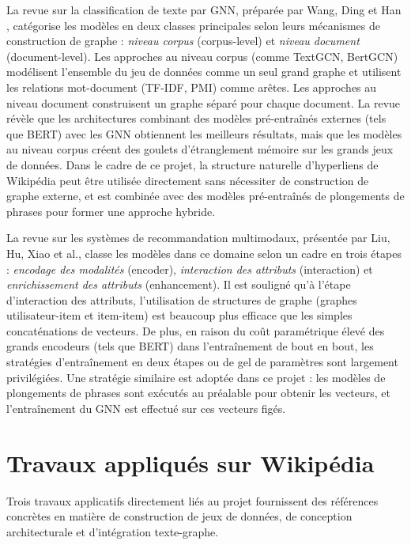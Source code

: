 La revue sur la classification de texte par GNN, préparée par Wang, Ding et Han \cite{li2022graph}, catégorise les modèles en deux classes principales selon leurs mécanismes de construction de graphe : \textit{niveau corpus} (corpus-level) et \textit{niveau document} (document-level). Les approches au niveau corpus (comme TextGCN, BertGCN) modélisent l'ensemble du jeu de données comme un seul grand graphe et utilisent les relations mot-document (TF-IDF, PMI) comme arêtes. Les approches au niveau document construisent un graphe séparé pour chaque document. La revue révèle que les architectures combinant des modèles pré-entraînés externes (tels que BERT) avec les GNN obtiennent les meilleurs résultats, mais que les modèles au niveau corpus créent des goulets d'étranglement mémoire sur les grands jeux de données. Dans le cadre de ce projet, la structure naturelle d'hyperliens de Wikipédia peut être utilisée directement sans nécessiter de construction de graphe externe, et est combinée avec des modèles pré-entraînés de plongements de phrases pour former une approche hybride.

La revue sur les systèmes de recommandation multimodaux, présentée par Liu, Hu, Xiao et al.\@ \cite{zhou2023multimodal}, classe les modèles dans ce domaine selon un cadre en trois étapes : \textit{encodage des modalités} (encoder), \textit{interaction des attributs} (interaction) et \textit{enrichissement des attributs} (enhancement). Il est souligné qu'à l'étape d'interaction des attributs, l'utilisation de structures de graphe (graphes utilisateur-item et item-item) est beaucoup plus efficace que les simples concaténations de vecteurs. De plus, en raison du coût paramétrique élevé des grands encodeurs (tels que BERT) dans l'entraînement de bout en bout, les stratégies d'entraînement en deux étapes ou de gel de paramètres sont largement privilégiées. Une stratégie similaire est adoptée dans ce projet : les modèles de plongements de phrases sont exécutés au préalable pour obtenir les vecteurs, et l'entraînement du GNN est effectué sur ces vecteurs figés.

\section{Travaux appliqués sur Wikipédia}

Trois travaux applicatifs directement liés au projet fournissent des références concrètes en matière de construction de jeux de données, de conception architecturale et d'intégration texte-graphe.

